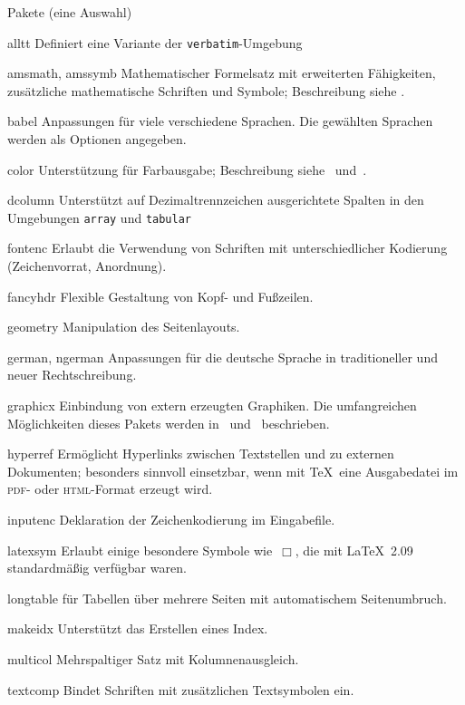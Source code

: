\begin{table}[htbp]
\caption{Pakete (eine Auswahl)}\label{pack}
\oben{11cm}
\begin{ttdescription}%
\setlength{\itemsep}{.5\itemsep plus1pt minus1pt}
\item[alltt] Definiert eine Variante der \texttt{verbatim}-Umgebung
\item[amsmath, amssymb] Mathematischer Formelsatz mit erweiterten Fähigkeiten,
  zusätzliche mathematische Schriften und Symbole; Beschreibung siehe
  \cite{ch8}.
\item[babel] Anpassungen für viele verschiedene Sprachen. Die
  gewählten Sprachen werden als Optionen angegeben.
\item[color] Unterstützung für Farbausgabe;
  Beschreibung  siehe~\cite{grfguide} und~\cite{grfcomp}.
\item[dcolumn] Unterstützt auf Dezimaltrennzeichen ausgerichtete
  Spalten in den Umgebungen \texttt{array} und \texttt{tabular}
\item[fontenc] Erlaubt die Verwendung von Schriften mit
  unterschiedlicher Kodierung (Zeichenvorrat, Anordnung).
\item[fancyhdr] Flexible Gestaltung von Kopf- und Fußzeilen.
\item[geometry] Manipulation des Seitenlayouts.
\item[german, ngerman] Anpassungen für die deutsche Sprache in
  traditioneller und neuer Rechtschreibung.
\item[graphicx] Einbindung von extern erzeugten Graphiken.
  Die umfangreichen Möglichkeiten dieses Pakets werden 
  in~\cite{grfguide} und~\cite{grfcomp} beschrieben.
\item[hyperref] Ermöglicht Hyperlinks zwischen Textstellen und zu
  externen Dokumenten; besonders sinnvoll einsetzbar, 
  wenn mit \TeX\ eine Ausgabedatei im \textsc{pdf}- oder \textsc{html}-Format 
  erzeugt wird.
\item[inputenc] Deklaration der Zeichenkodierung im
  Eingabefile.
\item[latexsym] Erlaubt einige besondere Symbole wie~\(\Box\),
  die mit \LaTeX~2.09 standardmäßig verfügbar waren.
\item[longtable]
  für Tabellen über mehrere Seiten mit automatischem Seitenumbruch.
\item[makeidx] Unterstützt das Erstellen eines Index.
\item[multicol] Mehrspaltiger Satz mit Kolumnenausgleich.
\item[textcomp] Bindet Schriften mit zusätzlichen Textsymbolen ein.
\end{ttdescription}
\unten
\end{table}


